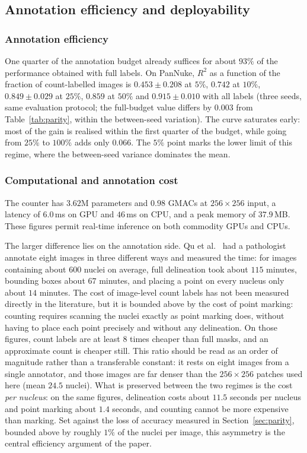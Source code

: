 \documentclass[pdflatex,sn-mathphys-num]{sn-jnl}
\begin{document}
\subsection{Annotation efficiency and deployability}\label{sec:deploy}
\subsubsection{Annotation efficiency}\label{sec:label}
One quarter of the annotation budget already suffices for about $93\%$ of the performance obtained with full
labels. On PanNuke, $R^2$ as a function of the fraction of count-labelled images is $0.453 \pm 0.208$ at $5\%$,
$0.742$ at $10\%$, $0.849 \pm 0.029$ at $25\%$, $0.859$ at $50\%$ and $0.915 \pm 0.010$ with all labels (three
seeds, same evaluation protocol; the full-budget value differs by $0.003$ from Table~\ref{tab:parity}, within
the between-seed variation). The curve saturates early: most of the gain is realised within the first quarter
of the budget, while going from $25\%$ to $100\%$ adds only $0.066$. The $5\%$ point marks the lower limit of
this regime, where the between-seed variance dominates the mean.

\subsubsection{Computational and annotation cost}\label{sec:cost}
The counter has $3.62$M parameters and $0.98$ GMACs at $256\times256$ input, a latency of $6.0$\,ms on GPU and
$46$\,ms on CPU, and a peak memory of $37.9$\,MB. These figures permit real-time inference on both commodity
GPUs and CPUs.

The larger difference lies on the annotation side. Qu et al.~\cite{qu2020} had a pathologist annotate eight
images in three different ways and measured the time: for images containing about $600$ nuclei on average, full
delineation took about $115$ minutes, bounding boxes about $67$ minutes, and placing a point on every nucleus
only about $14$ minutes. The cost of image-level count labels has not been measured directly in the
literature, but it is bounded above by the cost of point marking: counting requires scanning the nuclei exactly
as point marking does, without having to place each point precisely and without any delineation. On those
figures, count labels are at least $8$ times cheaper than full masks, and an approximate count is cheaper
still. This ratio should be read as an order of magnitude rather than a transferable constant: it rests on
eight images from a single annotator, and those images are far denser than the $256\times256$ patches used
here (mean $24.5$ nuclei). What is preserved between the two regimes is the cost \emph{per nucleus}: on the
same figures, delineation costs about $11.5$ seconds per nucleus and point marking about $1.4$ seconds, and
counting cannot be more expensive than marking. Set against the loss of accuracy measured in
Section~\ref{sec:parity}, bounded above by roughly $1\%$ of the nuclei per image, this asymmetry is the central
efficiency argument of the paper.
\end{document}
